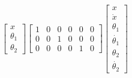 \documentclass[preview]{standalone}
\begin{document}
\begin{align*}
\left[\begin{matrix} x\\ \theta_1 \\ \theta_2 \end{matrix}\right] \left[\begin{matrix}1 & 0 & 0 & 0 & 0 & 0\\0 & 0 & 1 & 0 & 0 & 0\\0 & 0 & 0 & 0 & 1 & 0\end{matrix}\right] \left[\begin{matrix} x \\ \dot{x} \\ \theta_1 \\ \dot{\theta_1} \\ \theta_2 \\ \dot{\theta_2} \end{matrix}\right]
\end{align*}
\end{document}
